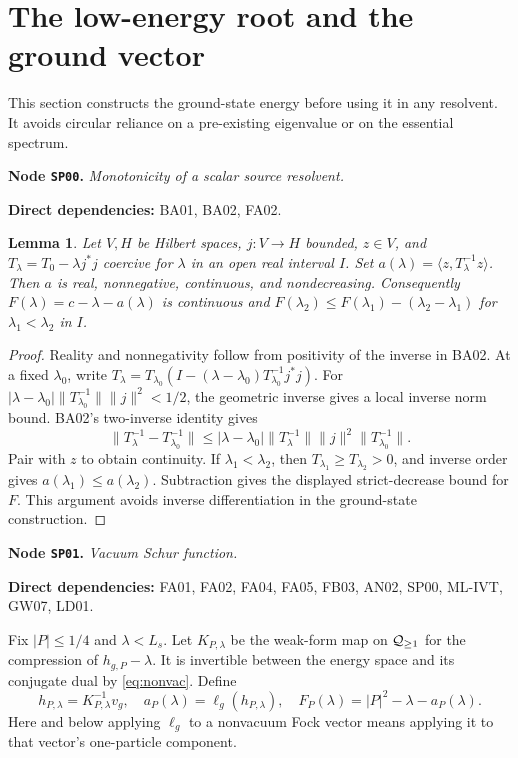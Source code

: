 \documentclass[11pt,a4paper]{article}
\newtheorem{lemma}[theorem]{Lemma}
\theoremstyle{remark}\newtheorem{remark}[theorem]{Remark}
\newcommand{\abs}[1]{\lvert #1\rvert}\newcommand{\rankone}[2]{\lvert #1\rangle\langle #2\rvert}
\newcommand{\node}[3]{\par\Needspace{6\baselineskip}\smallskip\hypertarget{node:#1}{}\label{nodepage:#1}\noindent\textbf{Node \texttt{#1}.} \textit{#2.}\par\noindent\textbf{Direct dependencies:} #3.\par}
\begin{document}
\section{The low-energy root and the ground vector}\label{sec:vacuum}
This section constructs the ground-state energy before using it in any resolvent. It avoids circular reliance on a pre-existing eigenvalue or on the essential spectrum.

\node{SP00}{Monotonicity of a scalar source resolvent}{BA01, BA02, FA02}
\begin{lemma}\label{lem:sourcefunction}
Let $V,H$ be Hilbert spaces, $j:V\to H$ bounded, $z\in V$, and
$T_\lambda=T_0-\lambda j^*j$ coercive for $\lambda$ in an open real interval $I$. Set $a(\lambda)=\langle z,T_\lambda^{-1}z\rangle$. Then $a$ is real, nonnegative, continuous, and nondecreasing. Consequently $F(\lambda)=c-\lambda-a(\lambda)$ is continuous and
$F(\lambda_2)\leq F(\lambda_1)-(\lambda_2-\lambda_1)$ for $\lambda_1<\lambda_2$ in $I$.
\end{lemma}
\begin{proof}
Reality and nonnegativity follow from positivity of the inverse in BA02. At a fixed $\lambda_0$, write
$T_\lambda=T_{\lambda_0}(I-(\lambda-\lambda_0)T_{\lambda_0}^{-1}j^*j)$.
For $|\lambda-\lambda_0|\|T_{\lambda_0}^{-1}\|\|j\|^2<1/2$, the geometric inverse gives a local inverse norm bound. BA02's two-inverse identity gives
\[
 \|T_\lambda^{-1}-T_{\lambda_0}^{-1}\|
 \leq |\lambda-\lambda_0|\|T_\lambda^{-1}\|\|j\|^2\|T_{\lambda_0}^{-1}\|.
\]
Pair with $z$ to obtain continuity. If $\lambda_1<\lambda_2$, then $T_{\lambda_1}\geq T_{\lambda_2}>0$, and inverse order gives $a(\lambda_1)\leq a(\lambda_2)$. Subtraction gives the displayed strict-decrease bound for $F$. This argument avoids inverse differentiation in the ground-state construction.
\end{proof}

\node{SP01}{Vacuum Schur function}{FA01, FA02, FA04, FA05, FB03, AN02, SP00, ML-IVT, GW07, LD01}
Fix $\abs P\leq1/4$ and $\lambda<L_s$. Let $K_{P,\lambda}$ be the weak-form map on $\mathcal Q_{\geq1}$ for the compression of $h_{g,P}-\lambda$. It is invertible between the energy space and its conjugate dual by \eqref{eq:nonvac}. Define
\[
 h_{P,\lambda}=K_{P,\lambda}^{-1}v_g,\quad
 a_P(\lambda)=\ell_g(h_{P,\lambda}),\quad
 F_P(\lambda)=\abs P^2-\lambda-a_P(\lambda).
\]
Here and below applying $\ell_g$ to a nonvacuum Fock vector means applying it to that vector's one-particle component.
\end{document}
